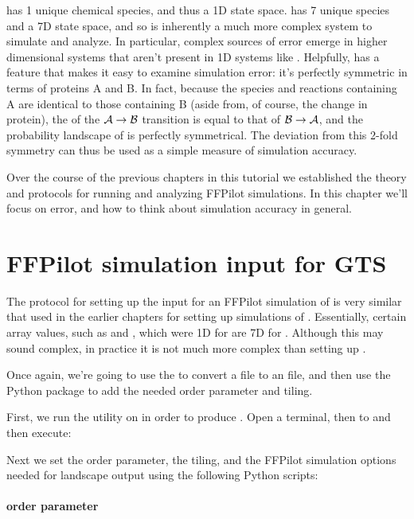 { has 1 unique chemical species, and thus a 1D state space.  has 7 unique species and a 7D state space, and so is inherently a much more complex system to simulate and analyze. In particular, complex sources of error emerge in higher dimensional systems that aren't present in 1D systems like . Helpfully,  has a feature that makes it easy to examine simulation error: it's perfectly symmetric in terms of proteins A and B. In fact, because the species and reactions containing A are identical to those containing B (aside from, of course, the change in protein), the  of the $\mathcal{A} \rightarrow \mathcal{B}$ transition is equal to that of $\mathcal{B} \rightarrow \mathcal{A}$, and the probability landscape of  is perfectly symmetrical. The deviation from this 2-fold symmetry can thus be used as a simple measure of simulation accuracy.

Over the course of the previous chapters in this tutorial we established the theory and protocols for running and analyzing FFPilot simulations. In this chapter we'll focus on error, and how to think about simulation accuracy in general.

\section{FFPilot simulation input for GTS}

The protocol for setting up the input for an FFPilot simulation of  is very similar that used in the earlier chapters for setting up simulations of . Essentially, certain array values, such as \code{\oparamcoeffs} and \code{\tilingbasins}, which were 1D for  are 7D for . Although this may sound complex, in practice it is not much more complex than setting up .

Once again, we're going to use the  to convert a  file to an  file, and then use the  Python package to add the needed order parameter and tiling.

First, we run the  utility on \pth{\sbml} in order to produce \pth{\lm}. Open a terminal, then  to \pth{\dir} and then execute:


Next we set the order parameter, the tiling, and the FFPilot simulation options needed for landscape output using the following Python scripts:\\
\\
\textbf{order parameter}

}
